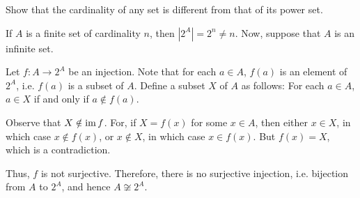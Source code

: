 \begin{Exercise}
Show that the cardinality of any set is different from that of its power set.
\end{Exercise}

\begin{Solution*}
If $A$ is a finite set of cardinality $n$, then $|2^A| = 2^n \ne n$. Now, suppose that $A$ is an infinite set.

Let $f \colon A \to 2^A$ be an injection. Note that for each $a \in A$, $f(a)$ is an element of $2^A$, i.e. $f(a)$ is a subset of $A$. Define a subset $X$ of $A$ as follows: For each $a \in A$, $a \in X$ if and only if $a \notin f(a)$.

Observe that $X \notin \operatorname{im} f$. For, if $X = f(x)$ for some $x \in A$, then either $x \in X$, in which case $x \notin f(x)$, or $x \notin X$, in which case $x \in f(x)$. But $f(x) = X$, which is a contradiction.

Thus, $f$ is not surjective. Therefore, there is no surjective injection, i.e. bijection from $A$ to $2^A$, and hence $A \not\cong 2^A$.
\end{Solution*}

%
